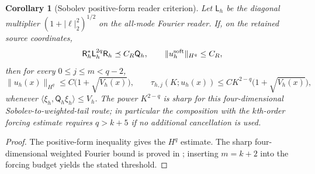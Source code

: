 \documentclass[11pt]{article}
\numberwithin{equation}{section}
\newtheorem{corollary}[corollary]{Corollary}
\theoremstyle{definition}
\theoremstyle{remark}
\newcommand{\norm}[1]{\lVert#1\rVert}
\newcommand{\ip}[2]{\langle#1,#2\rangle}
\begin{document}
\begin{corollary}[Sobolev positive-form reader criterion]
\label{cor:native-reader-sobolev}
Let $\mathsf L_h$ be the diagonal multiplier $(1+|\ell|_2^2)^{1/2}$ on the all-mode Fourier reader.  If, on the retained source coordinates,
\begin{equation}
 \mathsf R_h^*\mathsf L_h^{2q}\mathsf R_h\preceq C_R\mathsf Q_h,
 \qquad \norm{u_h^{\rm soft}}_{H^q}\le C_R,
 \label{eq:source-reader-LMI}
\end{equation}
then for every $0\le j\le m<q-2$,
\begin{equation}
 \norm{u_h(x)}_{H^q}\le C\bigl(1+\sqrt{V_h(x)}\bigr),\qquad
 \tau_{h,j}(K;u_h(x))
 \le C K^{2-q}\bigl(1+\sqrt{V_h(x)}\bigr),
 \label{eq:source-reader-Sobolev}
\end{equation}
whenever $\ip{\xi_h}{\mathsf Q_h\xi_h}\le V_h$.  The power $K^{2-q}$ is sharp for this four-dimensional Sobolev-to-weighted-tail route; in particular the composition with the $k$th-order forcing estimate requires $q>k+5$ if no additional cancellation is used.
\end{corollary}
\begin{proof}
The positive-form inequality gives the $H^q$ estimate.  The sharp four-dimensional weighted Fourier bound is proved in ; inserting $m=k+2$ into the forcing budget yields the stated threshold.
\end{proof}
\end{document}
